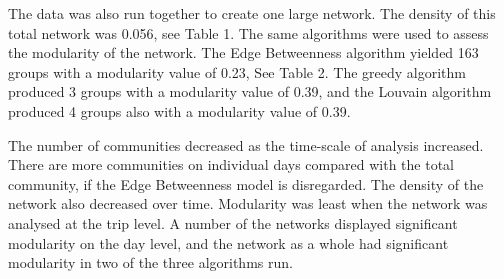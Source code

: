 \documentclass[11pt]{article}
\begin{document}
\newpage

\par The data was also run together to create one large network.  The density of this total network was 0.056, see Table 1.  The same algorithms were used to assess the modularity of the network.  The Edge Betweenness algorithm yielded 163 groups with a modularity value of 0.23, See Table 2.  The greedy algorithm produced 3 groups with a modularity value of 0.39, and the Louvain algorithm produced 4 groups also with a modularity value of 0.39.
\par The number of communities decreased as the time-scale of analysis increased.  There are more communities on individual days compared with the total community, if the Edge Betweenness model is disregarded.  The density of the network also decreased over time.  Modularity was least when the network was analysed at the trip level.  A number of the networks displayed significant modularity on the day level, and the network as a whole had significant modularity in two of the three algorithms run.  
\\

\end{document}
